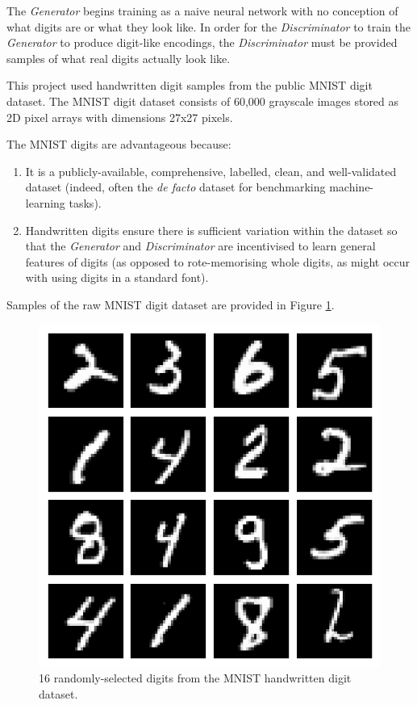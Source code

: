 \documentclass[a4paper,11pt,openany]{book}
\begin{document}
The \emph{Generator} begins training as a naive neural network with no conception of what digits are or what they look like.
In order for the \emph{Discriminator} to train the \emph{Generator} to produce digit-like encodings, the \emph{Discriminator} must be provided samples of what real digits actually look like.

This project used handwritten digit samples from the public MNIST digit dataset. \cite{Lecun1998}
The MNIST digit dataset consists of 60,000 grayscale images stored as 2D pixel arrays with dimensions 27x27 pixels.

The MNIST digits are advantageous because:
\begin{enumerate}
\item It is a publicly-available, comprehensive, labelled, clean, and well-validated dataset (indeed, often the \emph{de facto} dataset for benchmarking machine-learning tasks).
\item Handwritten digits ensure there is sufficient variation within the dataset so that the \emph{Generator} and \emph{Discriminator} are incentivised to learn general features of digits (as opposed to rote-memorising whole digits, as might occur with using digits in a standard font).
\end{enumerate}

Samples of the raw MNIST digit dataset are provided in Figure \ref{fig:org39d60e5}.

\begin{figure}[htbp]
\centering
\includegraphics[width=.9\linewidth]{./images/mnist_samples.png}
\caption{\label{fig:org39d60e5}
16 randomly-selected digits from the MNIST handwritten digit dataset.}
\end{figure}
\end{document}
